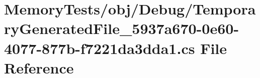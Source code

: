 \hypertarget{_memory_tests_2obj_2_debug_2_temporary_generated_file__5937a670-0e60-4077-877b-f7221da3dda1_8cs}{}\section{Memory\+Tests/obj/\+Debug/\+Temporary\+Generated\+File\+\_\+5937a670-\/0e60-\/4077-\/877b-\/f7221da3dda1.cs File Reference}
\label{_memory_tests_2obj_2_debug_2_temporary_generated_file__5937a670-0e60-4077-877b-f7221da3dda1_8cs}
